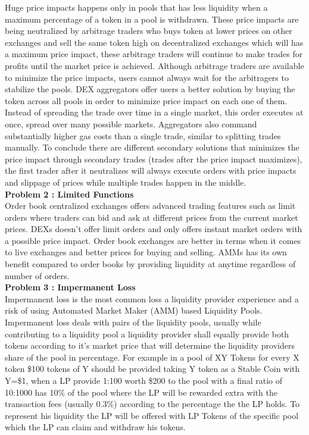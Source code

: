 \documentclass[10pt]{article}
\begin{document}
Huge price impacts happens only in pools that has less liquidity when a maximum percentage of a token in a pool is withdrawn. These price impacts are being neutralized by arbitrage traders who buys token at lower prices on other exchanges and sell the same token high on decentralized exchanges which will has a maximum price impact, these arbitrage traders will continue to make trades for profits until the market price is achieved. Although arbitrage traders are available to minimize the price impacts, users cannot always wait for the arbitragers to stabilize the pools. DEX aggregators offer users a better solution by buying the token across all pools in order to minimize price impact on each one of them. Instead of spreading the trade over time in a single market, this order executes at once, spread over many possible markets. Aggregators also command substantially higher gas costs than a single trade, similar to splitting trades manually. To conclude there are different secondary solutions that minimizes the price impact through secondary trades (trades after the price impact maximizes), the first trader after it neutralizes will always execute orders with price impacts and slippage of prices while multiple trades happen in the middle.\\

\textbf{Problem 2 : Limited Functions}\\

Order book centralized exchanges offers advanced trading features such as limit orders where traders can bid and ask at different prices from the current market prices. DEXs doesn't offer limit orders and only offers instant market orders with a possible price impact. Order book exchanges are better in terms when it comes to live exchanges and better prices for buying and selling. AMMs has its own benefit compared to order books by providing liquidity at anytime regardless of number of orders.\\

\textbf{Problem 3 : Impermanent Loss}\\

Impermanent loss is the most common loss a liquidity provider experience and a risk of using Automated Market Maker (AMM) based Liquidity Pools. Impermanent loss deals with pairs of the liquidity pools, usually while contributing to a liquidity pool a liquidity provider shall equally provide both tokens according to it's market price that will determine the liquidity providers share of the pool in percentage. For example in a pool of XY Tokens for every X token \$100 tokens of Y should be provided taking Y token as a Stable Coin with Y=\$1, when a LP provide 1:100 worth \$200 to the pool with a final ratio of 10:1000 has 10\% of the pool where the LP will be rewarded extra with the transaction fees (usually 0.3\%) according to the percentage the the LP holds. To represent his liquidity the LP will be offered with LP Tokens of the specific pool which the LP can claim and withdraw his tokens.\\
\end{document}
